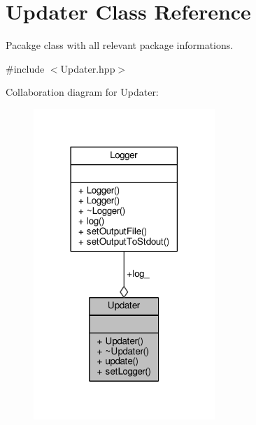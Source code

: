 \hypertarget{classUpdater}{\section{Updater Class Reference}
\label{classUpdater}
}


Pacakge class with all relevant package informations.  




{\ttfamily \#include $<$Updater.\-hpp$>$}



Collaboration diagram for Updater\-:\nopagebreak
\begin{figure}[H]
\begin{center}
\leavevmode
\includegraphics[width=194pt]{classUpdater__coll__graph}
\end{center}
\end{figure}
